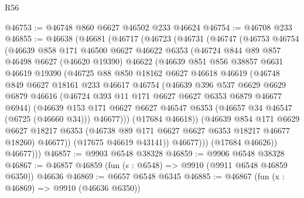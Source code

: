 \begin{lexlean}{R56}
\begin{coremodule}
@46753 := @46748 @860 @6627 @46502 @233 @46624
@46754 := @46708 @233
@46855 := @46638
    (@46681
      (@46717
        (@46723
          (@46731
            (@46747
              (@46753
                @46754
                (@46639
                  @858
                  @171
                  @46500
                  @6627
                  @46622
                  @6353
                  (@46724
                    @844
                    @89
                    @857
                    @46498
                    @6627
                    (@46620 @19390)
                    @46622
                    (@46639
                      @851
                      @856
                      @38857
                      @6631
                      @46619
                      @19390
                      (@46725
                        @88
                        @850
                        @18162
                        @6627
                        @46618
                        @46619
                        (@46748
                          @849
                          @6627
                          @18161
                          @233
                          @46617
                          @46754
                          (@46639
                            @396
                            @537
                            @6629
                            @6629
                            @6879
                            @46616
                            (@46724 @393 @11 @171 @6627 @6627 @6353 @6879 @46677 @6944)
                            (@46639
                              @153
                              @171
                              @6627
                              @6627
                              @46547
                              @6353
                              (@46657 @34 @46547 (@6725 (@46660 @34)))
                              @46677)))
                        (@17684 @46618))
                      (@46639
                        @854
                        @171
                        @6629
                        @6627
                        @18217
                        @6353
                        (@46738 @89 @171 @6627 @6627 @6353 @18217 @46677 @18260)
                        @46677))
                    (@17675 @46619 @43141))
                  @46677)))
            (@17684 @46626))
          @46677)))
@46857 := @9903 @6548 @38328
@46859 := @9906 @6548 @38328
@46867 := @46857 @46859 (fun (s : @6548) => @9910 (@9911 @6548 @46859 @6350)) @46636
@46869 := @6657 @6548 @6345
@46885 := @46867
    (fun (x : @46869) => @9910 (@46636 @6350))

\end{coremodule}
\end{lexlean}
